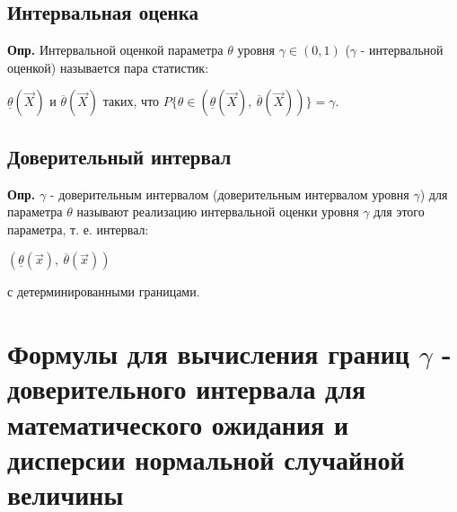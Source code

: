 \documentclass[a4paper,14pt, unknownkeysallowed]{extreport}
\begin{document}
\subsection{Интервальная оценка}

\textbf{Опр.} Интервальной оценкой параметра $\theta$ уровня $\gamma \in (0, 1)$ ($\gamma$ - интервальной оценкой) называется пара статистик:

\begin{center}
	$\underline{\theta} (\vec X)$ и $\overline{\theta} (\vec X)$ таких, что
	$P \{\theta \in (\underline{\theta} (\vec X), \ \overline{\theta} (\vec X))\} = \gamma$.
\end{center}

\subsection{Доверительный интервал}

\textbf{Опр.} $\gamma$ - доверительным интервалом (доверительным интервалом уровня $\gamma$) для параметра $\theta$ называют реализацию интервальной оценки уровня $\gamma$ для этого параметра, т. е. интервал:

\begin{center}
	$(\underline{\theta} (\vec x), \ \overline{\theta} (\vec x))$
\end{center}
с детерминированными границами.

\clearpage

\section{Формулы для вычисления границ $\gamma$ - доверительного интервала для математического ожидания и дисперсии нормальной случайной величины}
\end{document}
